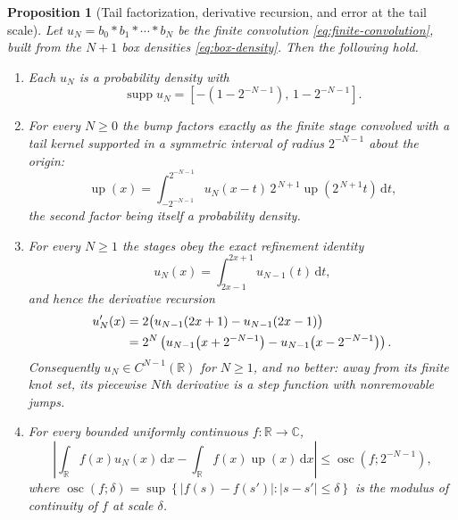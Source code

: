 \documentclass[11pt,oneside]{article}
\newtheorem{proposition}[theorem]{Proposition}
\theoremstyle{definition}
\theoremstyle{remark}
\newcommand{\R}{\mathbb R}
\newcommand{\C}{\mathbb C}
\newcommand{\Up}{\operatorname{up}}
\newcommand{\dd}{\,\mathrm d}
\newcommand{\supp}{\operatorname{supp}}
\begin{document}
\begin{proposition}[Tail factorization, derivative recursion, and error at the tail scale]
\label{prop:res-convolutions}
Let $u_N=b_0*b_1*\cdots*b_N$ be the finite convolution \eqref{eq:finite-convolution}, built
from the $N+1$ box densities \eqref{eq:box-density}.  Then the following hold.
\begin{enumerate}
\item Each $u_N$ is a probability density with
\begin{equation}
 \supp u_N=\left[-\left(1-2^{-N-1}\right),\,1-2^{-N-1}\right].
                                                          \label{eq:res-conv-support}
\end{equation}
\item For every $N\ge0$ the bump factors exactly as the finite stage convolved with a tail
kernel supported in a symmetric interval of radius $2^{-N-1}$ about the origin:
\begin{equation}
 \Up(x)=\int_{-2^{-N-1}}^{2^{-N-1}}
 u_N(x-t)\,2^{\,N+1}\Up\!\left(2^{\,N+1}t\right)\dd t,
                                                          \label{eq:res-tail-factorization}
\end{equation}
the second factor being itself a probability density.
\item For every $N\ge1$ the stages obey the exact refinement identity
\begin{equation}
 u_N(x)=\int_{2x-1}^{2x+1}u_{N-1}(t)\dd t,                \label{eq:res-finite-refinement}
\end{equation}
and hence the derivative recursion
\begin{align}
 u_N'(x)
 &=2\bigl(u_{N-1}(2x+1)-u_{N-1}(2x-1)\bigr) \notag\\
 &=2^{N}\left(u_{N-1}\!\left(x+2^{-N-1}\right)
             -u_{N-1}\!\left(x-2^{-N-1}\right)\right).
                                                          \label{eq:res-derivative-recursion}
\end{align}
Consequently $u_N\in C^{N-1}(\R)$ for $N\ge1$, and no better: away from its finite knot set,
its piecewise $N$th derivative is a step function with nonremovable jumps.
\item For every bounded uniformly continuous $f:\R\to\C$,
\begin{equation}
 \left|\int_{\R}f(x)u_N(x)\dd x-\int_{\R}f(x)\Up(x)\dd x\right|
 \le\operatorname{osc}\!\left(f;2^{-N-1}\right),          \label{eq:res-tail-error}
\end{equation}
where $\operatorname{osc}(f;\delta)=\sup\left\{|f(s)-f(s')|:|s-s'|\le\delta\right\}$ is the
modulus of continuity of $f$ at scale $\delta$.
\end{enumerate}
\end{proposition}
\end{document}
